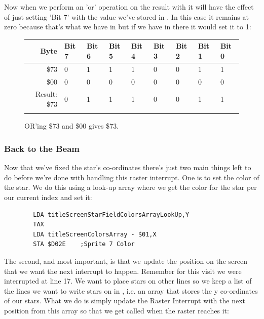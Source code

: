 Now when we perform an 'or' operation on the result with  it will have the effect of just setting 'Bit 7'
with the value we've stored in . In this case it remains at zero because that's what we have in
 but if we have  in there it would set it to 1: 

\begin{figure}[H]
  {
    \setlength{\tabcolsep}{3.0pt}
    \setlength\cmidrulewidth{\heavyrulewidth} %
    \begin{adjustbox}{width=10cm,center}

      \begin{tabular}{rllllllll}
        \toprule
        Byte & Bit 7 & Bit 6 & Bit 5 & Bit 4 & Bit 3 & Bit 2 & Bit 1 & Bit 0        \\
        \midrule
        \$73 & 0 & 1 & 1 & 1 & 0 & 0 & 1 & 1 \\
        \$00 & 0 & 0 & 0 & 0 & 0 & 0 & 0 & 0 \\
        \midrule
        Result: \$73 & 0 & 1 & 1 & 1 & 0 & 0 & 1 & 1 \\
        \addlinespace
        \bottomrule
      \end{tabular}
    \end{adjustbox}
  }\caption*{OR'ing \$73 and \$00 gives \$73.}
\end{figure}

\subsubsection{Back to the Beam}
Now that we've fixed the star's co-ordinates there's just two main things left to do before we're done with
handling this raster interrupt. One is to set the color of the star. We do this using a look-up array
where we get the color for the star per our current index and set it:

\begin{lstlisting}
        LDA titleScreenStarFieldColorsArrayLookUp,Y
        TAX
        LDA titleScreenColorsArray - $01,X
        STA $D02E    ;Sprite 7 Color
\end{lstlisting}

The second, and most important, is that we update the position on the screen that we want the next interrupt to
happen. Remember for this visit we were interrupted at line 17. We want to place stars on other lines so we keep
a list of the lines we want to write stars on in , i.e. an array that
stores the y co-ordinates of our stars. What we do is simply update the Raster Interrupt with the next position
from this array so that we get called when the raster reaches it:


